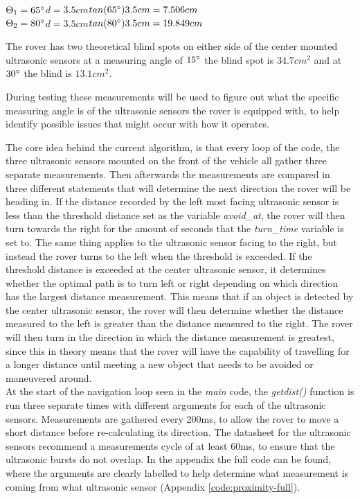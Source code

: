 $\Theta_1 = 65\degree$\quad\quad$d = 3.5cm$\quad\quad$tan(65\degree)3.5cm =  7.506cm$\\
$\Theta_2 = 80\degree$\quad\quad$d = 3.5cm$\quad\quad$tan(80\degree)3.5cm =  19.849cm$

The rover has two theoretical blind spots on either side of the center mounted ultrasonic sensors at a measuring angle of $15\degree$ the blind spot is $34.7cm^2$ and at $30\degree$ the blind is $13.1cm^2$. 

During testing these measurements will be used to figure out what the specific measuring angle is of the ultrasonic sensors the rover is equipped with, to help identify possible issues that might occur with how it operates.

\clearpage


The core idea behind the current algorithm, is that every loop of the code, the three ultrasonic sensors mounted on the front of the vehicle all gather three separate measurements. Then afterwards the measurements are compared in three different statements that will determine the next direction the rover will be heading in. If the distance recorded by the left most facing ultrasonic sensor is less than the threshold distance set as the variable \textit{avoid\_at}, the rover will then turn towards the right for the amount of seconds that the \textit{turn\_time} variable is set to. The same thing applies to the ultrasonic sensor facing to the right, but instead the rover turns to the left when the threshold is exceeded.
If the threshold distance is exceeded at the center ultrasonic sensor, it determines whether the optimal path is to turn left or right depending on which direction has the largest distance measurement. This means that if an object is detected by the center ultrasonic sensor, the rover will then determine whether the distance measured to the left is greater than the distance measured to the right. The rover will then turn in the direction in which the distance measurement is greatest, since this in theory means that the rover will have the capability of travelling for a longer distance until meeting a new object that needs to be avoided or maneuvered around.\\




At the start of the navigation loop seen in the \textit{main} code, the \textit{getdist()} function is run three separate times with different arguments for each of the ultrasonic sensors. Measurements are gathered every 200ms, to allow the rover to move a short distance before re-calculating its direction. The datasheet for the ultrasonic sensors recommend a measurements cycle of at least 60ms, to ensure that the ultrasonic bursts do not overlap. In the appendix the full code can be found, where the arguments are clearly labelled to help determine what measurement is coming from what ultrasonic sensor (Appendix \ref{code:proximity-full}).
